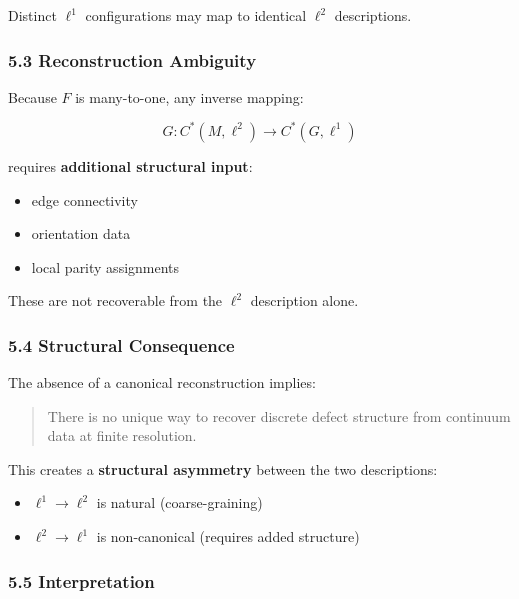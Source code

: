 \documentclass[
]{article}
\providecommand{\tightlist}{%
  \setlength{\itemsep}{0pt}\setlength{\parskip}{0pt}}
\begin{document}
Distinct \(\ell^1\) configurations may map to identical \(\ell^2\)
descriptions.

\hypertarget{reconstruction-ambiguity}{%
\subsubsection{5.3 Reconstruction
Ambiguity}\label{reconstruction-ambiguity}}

Because \(F\) is many-to-one, any inverse mapping:

\[G: C^*(M, \ell^2) \to C^*(G, \ell^1)\]

requires \textbf{additional structural input}:

\begin{itemize}
\tightlist
\item
  edge connectivity
\item
  orientation data
\item
  local parity assignments
\end{itemize}

These are not recoverable from the \(\ell^2\) description alone.

\hypertarget{structural-consequence}{%
\subsubsection{5.4 Structural
Consequence}\label{structural-consequence}}

The absence of a canonical reconstruction implies:

\begin{quote}
There is no unique way to recover discrete defect structure from
continuum data at finite resolution.
\end{quote}

This creates a \textbf{structural asymmetry} between the two
descriptions:

\begin{itemize}
\tightlist
\item
  \(\ell^1 \to \ell^2\) is natural (coarse-graining)
\item
  \(\ell^2 \to \ell^1\) is non-canonical (requires added structure)
\end{itemize}

\hypertarget{interpretation}{%
\subsubsection{5.5 Interpretation}\label{interpretation}}
\end{document}
